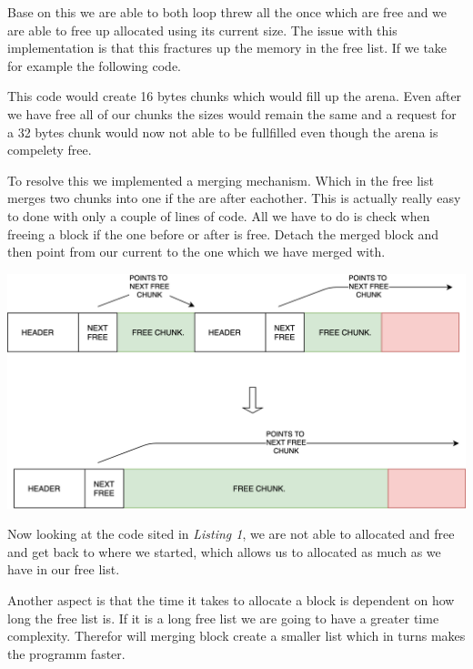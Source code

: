 \documentclass{article}
\begin{document}
Base on this we are able to both loop threw all the once which are free and we are able to free up allocated using its current size. The issue with this implementation is that this fractures up the memory in the free list. If we take for example the following code.





This code would create 16 bytes chunks which would fill up the arena. Even after we have free all of our chunks the sizes would remain the same and a request for a 32 bytes chunk would now not able to be fullfilled even though the arena is compelety free.



To resolve this we implemented a merging mechanism. Which in the free list merges two chunks into one if the are after eachother. This is actually really easy to done with only a couple of lines of code. All we have to do is check when freeing a block if the one before or after is free. Detach the merged block and then point from our current to the one which we have merged with. \newline

\begin{center}
    \includegraphics[scale=0.12]{images/merging-example.png}
\end{center}
     

Now looking at the code sited in \emph{Listing 1}, we are not able to allocated and free and get back to where we started, which allows us to allocated as much as we have in our free list.

Another aspect is that the time it takes to allocate a block is dependent on how long the free list is. If it is a long free list we are going to have a greater time complexity. Therefor will merging block create a smaller list which in turns makes the programm faster.
\end{document}

